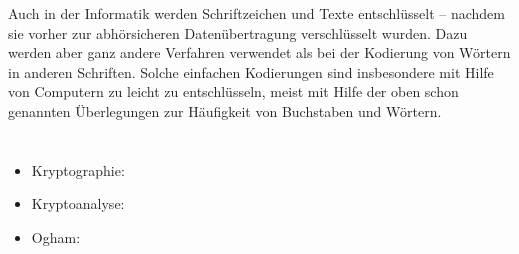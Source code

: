 {{Auch in der Informatik werden Schriftzeichen und Texte entschlüsselt – nachdem sie vorher zur abhörsicheren Datenübertragung verschlüsselt wurden.  Dazu werden aber ganz andere Verfahren verwendet als bei der Kodierung von Wörtern in anderen Schriften.  Solche einfachen Kodierungen sind insbesondere mit Hilfe von Computern zu leicht zu entschlüsseln, meist mit Hilfe der oben schon genannten Überlegungen zur Häufigkeit von Buchstaben und Wörtern.



\section*{\BrochureWebsitesAndKeywords}
{\raggedright
\begin{itemize}
  \item Kryptographie: \href{https://de.wikipedia.org/wiki/Kryptographie}{}
  \item Kryptoanalyse: \href{https://de.wikipedia.org/wiki/Kryptoanalyse}{}
  \item Ogham: \href{https://de.wikipedia.org/wiki/Ogham}{}
\end{itemize}


}

}{}

\def\AuthorColreavyE{} %
\def\AuthorLehtimakiT{} %
\def\AuthorBarichelloL{} %
\def\AuthorStijfA{} %
\def\AuthorFutschekG{} %
\def\AuthorDatzkoC{} %
\def\AuthorPluharZ{} %
\def\AuthorPohlW{} %

\newpage}{}
